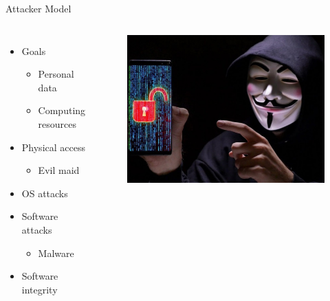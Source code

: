 \documentclass[]{beamer}
\begin{document}
\begin{frame}{Attacker Model}
\begin{columns}
\begin{itemize}
\item Goals \begin{itemize}
\item Personal data
\item Computing resources
\end{itemize}
\item Physical access
\begin{itemize}
\item Evil maid
\end{itemize}
\item OS attacks
\item Software attacks \begin{itemize}
\item Malware
\end{itemize}
\item Software integrity
\end{itemize}
\begin{figure}
\includegraphics[width=1\textwidth]{Pictures/hacker.jpg}

\end{figure}
\end{columns}
\end{frame}
\end{document}
